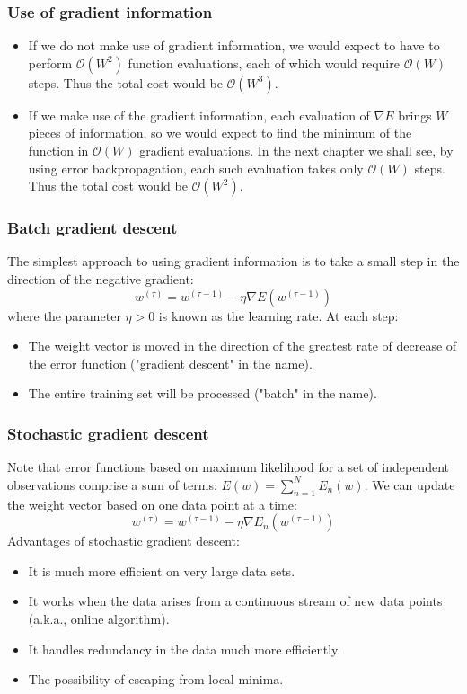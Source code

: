 \documentclass{beamer}
\begin{document}
\begin{frame}
    \frametitle{Use of gradient information}
    \begin{itemize}
        \item If we do not make use of gradient information, we would expect to have to perform $\mathcal{O}(W^{2})$ function evaluations, each of which would require $\mathcal{O}(W)$ steps. Thus the total cost would be $\mathcal{O}(W^{3})$.
        \item If we make use of the gradient information, each evaluation of $\nabla{}E$ brings $W$ pieces of information, so we would expect to find the minimum of the function in $\mathcal{O}(W)$ gradient evaluations. In the next chapter we shall see, by using error backpropagation, each such evaluation takes only $\mathcal{O}(W)$ steps. Thus the total cost would be $\mathcal{O}(W^{2})$.
    \end{itemize}
\end{frame}

\begin{frame}
    \frametitle{Batch gradient descent}
    The simplest approach to using gradient information is to take a small step in the direction of the negative gradient:
    \begin{equation*}
        w^{(\tau)}=w^{(\tau-1)}-\eta\nabla{}E(w^{(\tau-1)})
    \end{equation*}
    where the parameter $\eta>0$ is known as the learning rate. At each step:
    \begin{itemize}
        \item The weight vector is moved in the direction of the greatest rate of decrease of the error function ("gradient descent" in the name).
        \item The entire training set will be processed ("batch" in the name).
    \end{itemize}
\end{frame}

\begin{frame}
    \frametitle{Stochastic gradient descent}
    Note that error functions based on maximum likelihood for a set of independent observations comprise a sum of terms: $E(w)=\sum_{n=1}^{N}E_{n}(w)$. We can update the weight vector based on one data point at a time:
    \begin{equation*}
        w^{(\tau)}=w^{(\tau-1)}-\eta\nabla{}E_{n}(w^{(\tau-1)})
    \end{equation*}
    Advantages of stochastic gradient descent:
    \begin{itemize}
        \item It is much more efficient on very large data sets.
        \item It works when the data arises from a continuous stream of new data points (a.k.a., online algorithm).
        \item It handles redundancy in the data much more efficiently.
        \item The possibility of escaping from local minima.
    \end{itemize}
\end{frame}
\end{document}
